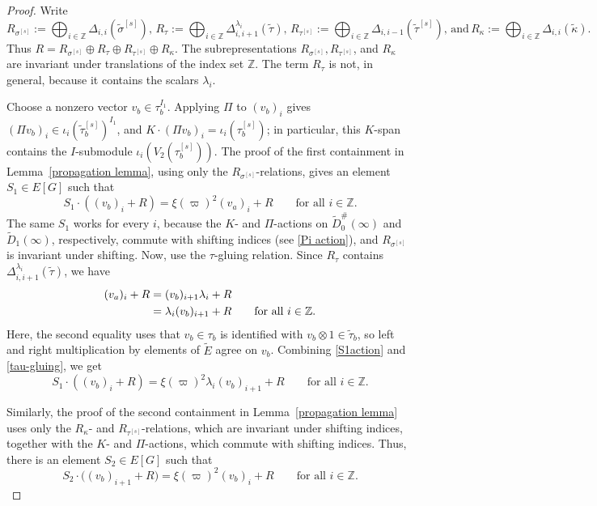 \documentclass[a4paper,10pt,twoside]{amsart}
\theoremstyle{definition}
\numberwithin{equation}{section}
\begin{document}
\begin{proof}
Write
\[
R_{\sigma^{[s]}}
:=\bigoplus_{i\in\mathbb Z}
\Delta_{i,i}(\widetilde{\sigma}^{[s]}),\,
R_{\tau}:=\bigoplus_{i\in\mathbb Z}
\Delta_{i,i+1}^{\lambda_i}(\widetilde{\tau}),\,
R_{\tau^{[s]}}:=\bigoplus_{i\in\mathbb Z}\Delta_{i,i-1}(\widetilde{\tau}^{[s]}),\,\text{and}\,
R_{\kappa}:=\bigoplus_{i\in\mathbb Z}
\Delta_{i,i}(\widetilde{\kappa}).
\]
Thus $R=
R_{\sigma^{[s]}}
\oplus
R_\tau
\oplus
R_{\tau^{[s]}}
\oplus
R_\kappa$. The subrepresentations
\(R_{\sigma^{[s]}},R_{\tau^{[s]}}\), and
\(R_\kappa\) are invariant under translations of the index set
\(\mathbb Z\). The term \(R_\tau\) is not, in general, because it
contains the scalars \(\lambda_i\).

Choose a nonzero vector \(v_b\in\tau_b^{I_1}\). Applying \(\Pi\) to
\((v_b)_i\) gives \((\Pi v_b)_i\in
\iota_i(\widetilde{\tau}_b^{[s]})^{I_1}\), and \(K\cdot(\Pi v_b)_i= \iota_i(\tau_b^{[s]})\); in particular, this \(K\)-span contains the $I$-submodule \(\iota_i(V_2(\tau_b^{[s]}))\).
The proof of the first containment in
Lemma~\ref{propagation lemma}, using only the
\(R_{\sigma^{[s]}}\)-relations, gives an element
\(S_1\in E[G]\) such that
\begin{equation}\label{S1action}
S_1\cdot ((v_b)_i+R)
=
\xi(\varpi)^2 (v_a)_i+R
\qquad\text{for all } i\in\mathbb Z.
\end{equation}
The same \(S_1\) works for every \(i\), because the \(K\)- and \(\Pi\)-actions on $\widetilde D_0^\#(\infty)$ and $\widetilde D_1(\infty)$, respectively, commute with shifting indices (see \eqref{Pi action}), and
\(R_{\sigma^{[s]}}\) is invariant under shifting. Now, use the \(\tau\)-gluing relation. Since
\(R_\tau\) contains
\(\Delta^{\lambda_i}_{i,i+1}(\widetilde\tau)\), we have
\begin{align}
(v_a)_i+R
&=(v_b)_{i+1}\lambda_i+R \notag\\
&=\lambda_i(v_b)_{i+1}+R
\qquad\text{for all }i\in\mathbb Z.
\label{tau-gluing}
\end{align}
Here, the second equality uses that
\(v_b\in\tau_b\) is identified with
\(v_b\otimes 1\in\widetilde\tau_b\), so left and right
multiplication by elements of \(\widetilde E\) agree on \(v_b\). Combining \eqref{S1action} and \eqref{tau-gluing}, we get
\begin{equation}\label{finalS1action}
S_1\cdot ((v_b)_i+R)
=
\xi(\varpi)^2 \lambda_i (v_b)_{i+1} +R
\qquad\text{for all } i\in\mathbb Z.
\end{equation}



Similarly, the proof of the second containment in
Lemma~\ref{propagation lemma} uses only the
\(R_\kappa\)- and
\(R_{\tau^{[s]}}\)-relations, which are invariant under
shifting indices, together with the \(K\)- and \(\Pi\)-actions, which commute
with shifting indices. Thus, there is an element \(S_2\in E[G]\) such
that
\begin{equation}
S_2\cdot\bigl((v_b)_{i+1}+R\bigr)
=
\xi(\varpi)^2(v_b)_i+R
\qquad\text{for all }i\in\mathbb Z.
\label{S2action}
\end{equation}


\end{proof}
\end{document}
